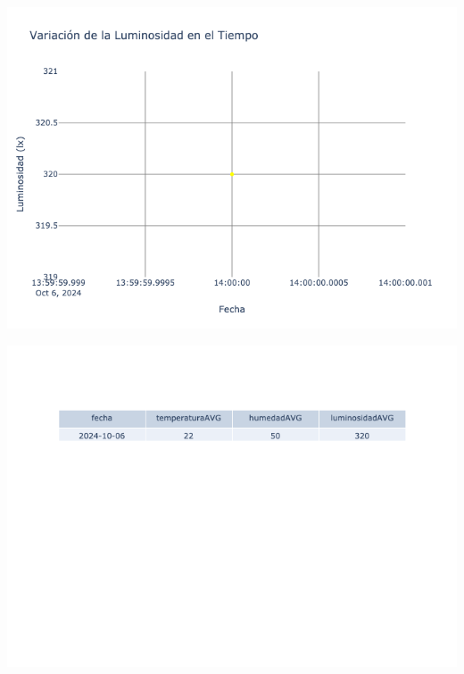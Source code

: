 \documentclass{article}
\begin{document}
    \noindent
    \begin{minipage}{0.48\textwidth}
        \centering
        \includegraphics[width=\textwidth]{../img/poli/LS301-90Dias-03-12-2024.png}
    \end{minipage}
    \hfill
    \begin{minipage}{0.48\textwidth}
        \centering
        \includegraphics[width=\textwidth]{../img/tables/CAVG301-90Dias-03-12-2024.png}
    \end{minipage}
    
\end{document}
